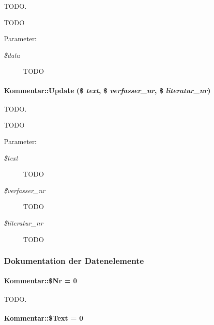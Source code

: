 TODO. 

TODO \begin{Desc}
\item[Parameter:]
\begin{description}
\item[{\em \$data}]TODO \end{description}
\end{Desc}
\hypertarget{classKommentar_074f62a61ba97457894fc52935724116}{
\paragraph[Update]{\setlength{\rightskip}{0pt plus 5cm}Kommentar::Update (\$ {\em text}, \$ {\em verfasser\_\-nr}, \$ {\em literatur\_\-nr})}\hfill}
\label{classKommentar_074f62a61ba97457894fc52935724116}


TODO. 

TODO \begin{Desc}
\item[Parameter:]
\begin{description}
\item[{\em \$text}]TODO \item[{\em \$verfasser\_\-nr}]TODO \item[{\em \$literatur\_\-nr}]TODO \end{description}
\end{Desc}


\subsubsection{Dokumentation der Datenelemente}
\hypertarget{classKommentar_1b0a3cfcb9fc7075f985cc8067ab1982}{
\paragraph[\$Nr]{\setlength{\rightskip}{0pt plus 5cm}Kommentar::\$Nr = 0}\hfill}
\label{classKommentar_1b0a3cfcb9fc7075f985cc8067ab1982}


TODO. 

\hypertarget{classKommentar_c9a481413d6ba0c000719ad514bad4b5}{
\paragraph[\$Text]{\setlength{\rightskip}{0pt plus 5cm}Kommentar::\$Text = 0}\hfill}
\label{classKommentar_c9a481413d6ba0c000719ad514bad4b5}


